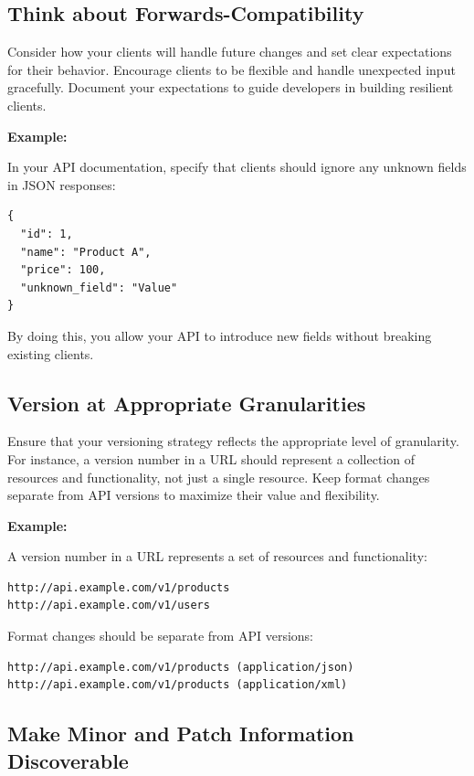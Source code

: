 \documentclass{article}
\begin{document}
\subsection{Think about Forwards-Compatibility}

Consider how your clients will handle future changes and set clear expectations for their behavior. Encourage clients to be flexible and handle unexpected input gracefully. Document your expectations to guide developers in building resilient clients.

\textbf{Example:}

In your API documentation, specify that clients should ignore any unknown fields in JSON responses:

\begin{verbatim}
{
  "id": 1,
  "name": "Product A",
  "price": 100,
  "unknown_field": "Value"
}
\end{verbatim}

By doing this, you allow your API to introduce new fields without breaking existing clients.

\subsection{Version at Appropriate Granularities}

Ensure that your versioning strategy reflects the appropriate level of granularity. For instance, a version number in a URL should represent a collection of resources and functionality, not just a single resource. Keep format changes separate from API versions to maximize their value and flexibility.

\textbf{Example:}

A version number in a URL represents a set of resources and functionality:

\begin{verbatim}
http://api.example.com/v1/products
http://api.example.com/v1/users
\end{verbatim}

Format changes should be separate from API versions:

\begin{verbatim}
http://api.example.com/v1/products (application/json)
http://api.example.com/v1/products (application/xml)
\end{verbatim}

\subsection{Make Minor and Patch Information Discoverable}
\end{document}

